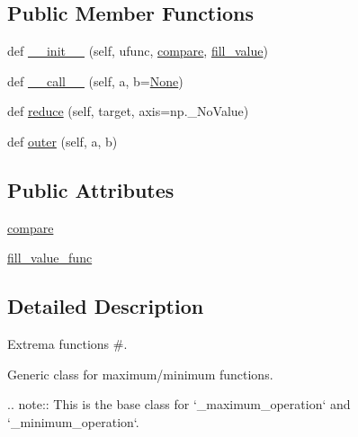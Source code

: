 \subsection*{Public Member Functions}
\begin{DoxyCompactItemize}
\item 
def \hyperlink{classnumpy_1_1ma_1_1core_1_1__extrema__operation_a26436cfe318a8368228b2a1e8b4646dd}{\+\_\+\+\_\+init\+\_\+\+\_\+} (self, ufunc, \hyperlink{classnumpy_1_1ma_1_1core_1_1__extrema__operation_a2809d733972f637f9dc2f245d1e304b8}{compare}, \hyperlink{namespacenumpy_1_1ma_1_1core_ae299ee1b3a1e5865fcdc6ca98dbe24d2}{fill\+\_\+value})
\item 
def \hyperlink{classnumpy_1_1ma_1_1core_1_1__extrema__operation_af70e4df17450e7435734ac8af006dd6b}{\+\_\+\+\_\+call\+\_\+\+\_\+} (self, a, b=\hyperlink{namespacenumpy_1_1ma_1_1core_a647ee1848dfa3692fe35a663a2aa40b3}{None})
\item 
def \hyperlink{classnumpy_1_1ma_1_1core_1_1__extrema__operation_acf541b144b3c822dd785ffbf01ba4a84}{reduce} (self, target, axis=np.\+\_\+\+No\+Value)
\item 
def \hyperlink{classnumpy_1_1ma_1_1core_1_1__extrema__operation_a54f98eb5e5cd22781fce6729c0b36be4}{outer} (self, a, b)
\end{DoxyCompactItemize}
\subsection*{Public Attributes}
\begin{DoxyCompactItemize}
\item 
\hyperlink{classnumpy_1_1ma_1_1core_1_1__extrema__operation_a2809d733972f637f9dc2f245d1e304b8}{compare}
\item 
\hyperlink{classnumpy_1_1ma_1_1core_1_1__extrema__operation_a76a3dac7bc2d654bbfac87fcb9ea30df}{fill\+\_\+value\+\_\+func}
\end{DoxyCompactItemize}


\subsection{Detailed Description}
Extrema functions \#. 

\begin{DoxyVerb}Generic class for maximum/minimum functions.

.. note::
  This is the base class for `_maximum_operation` and
  `_minimum_operation`.\end{DoxyVerb}
 

